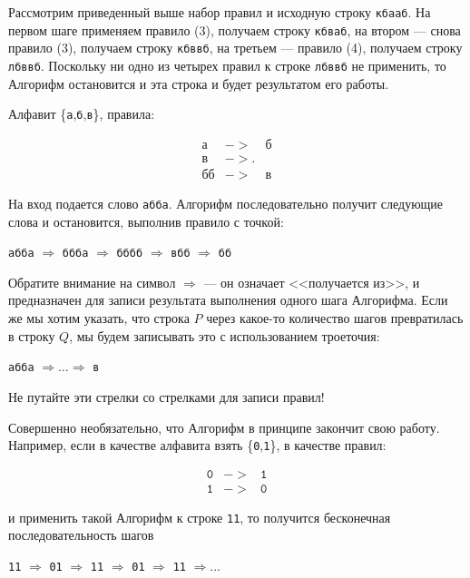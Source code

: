 \documentclass[12pt,a4paper,oneside]{article}
\newcommand{\s}[1]{\texttt{#1}}
\begin{document}
\begin{example} Рассмотрим приведенный выше набор правил и исходную
строку \s{кбааб}. На первом шаге применяем правило (3),
получаем строку \s{кбваб}, на втором --- снова правило (3), получаем строку
\s{кбввб}, на третьем --- правило (4), получаем строку \s{лбввб}. 
Поскольку ни одно из четырех правил к строке \s{лбввб} не применить,
то Алгорифм остановится и эта строка и будет результатом его работы.
\end{example}

\begin{example} Алфавит \{\s{а},\s{б},\s{в}\}, правила:
\begin{bnf}\begin{eqnarray*}
   \s{а}&->&\s{б}\\
   \s{в}&->.&\\
   \s{бб}&->&\s{в}
\end{eqnarray*}\end{bnf}  

   На вход подается слово \s{абба}. Алгорифм последовательно получит 
   следующие слова и остановится, выполнив правило с точкой:
\begin{center}\s{абба} $\Rightarrow$ 
   \s{ббба} $\Rightarrow$ 
   \s{бббб} $\Rightarrow$ 
   \s{вбб}  $\Rightarrow$ 
   \s{бб}\end{center}
\end{example}

Обратите внимание на символ $\Rightarrow$ --- он означает <<получается из>>,
и предназначен для записи результата выполнения одного шага Алгорифма. 
Если же мы хотим указать, что строка $P$ через какое-то количество
шагов превратилась в строку $Q$, мы будем записывать это
с использованием троеточия:
\begin{center}\s{абба} $\Rightarrow\dots\Rightarrow$ \s{в}\end{center}
Не путайте эти стрелки со стрелками для записи правил! 

Совершенно необязательно, что Алгорифм в принципе закончит свою работу. 
Например, если в качестве алфавита взять \{\s{0},\s{1}\}, 
в качестве правил:
\begin{bnf}\begin{eqnarray*}
   \s{0}&->&\s{1}\\
   \s{1}&->&\s{0}
\end{eqnarray*}\end{bnf}и применить такой Алгорифм к строке \s{11}, то 
получится бесконечная последовательность шагов \begin{center}\s{11} 
$\Rightarrow$ \s{01} $\Rightarrow$ \s{11} $\Rightarrow$ \s{01} 
$\Rightarrow$ \s{11} $\Rightarrow \dots$\end{center}
\end{document}
